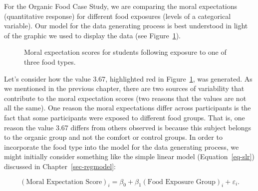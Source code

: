 \documentclass[
  letterpaper,
  DIV=11,
  numbers=noendperiod]{scrreprt}
\theoremstyle{plain}
\theoremstyle{definition}
\theoremstyle{definition}
\theoremstyle{remark}
\begin{document}
For the Organic Food Case Study, we are comparing the moral expectations
(quantitative response) for different food exposures (levels of a
categorical variable). Our model for the data generating process is best
understood in light of the graphic we used to display the data (see
Figure~\ref{fig-anovamodel-organic-plot}).

\begin{figure}


\caption{\label{fig-anovamodel-organic-plot}Moral expectation scores for
students following exposure to one of three food types.}

\end{figure}%

Let's consider how the value 3.67, highlighted red in
Figure~\ref{fig-anovamodel-organic-plot}, was generated. As we mentioned
in the previous chapter, there are two sources of variability that
contribute to the moral expectation scores (two reasons that the values
are not all the same). One reason the moral expectations differ across
participants is the fact that some participants were exposed to
different food groups. That is, one reason the value 3.67 differs from
others observed is because this subject belongs to the organic group and
not the comfort or control groups. In order to incorporate the food type
into the model for the data generating process, we might initially
consider something like the simple linear model (Equation~\ref{eq-slr})
discussed in Chapter~\ref{sec-regmodel}:

\[(\text{Moral Expectation Score})_i = \beta_0 + \beta_1 (\text{Food Exposure Group})_i + \varepsilon_i.\]
\end{document}
